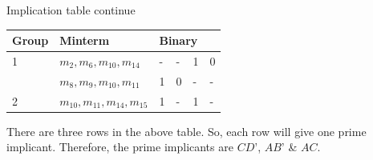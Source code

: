 \documentclass{beamer}
\newcommand{\mcl}[1]{\multicolumn{1}{l|}{#1}}
\begin{document}
\begin{frame}{Implication table continue}
    \begin{table}[]
        \begin{tabular}{l|l|llll}
            \hline
            \multicolumn{1}{|l|}{Group}         & Minterm        & \multicolumn{4}{l|}{Binary}     \\ \hline
            \rowcolor{row1} 1 \multirow{4}{*}{} & $m_2,m_6,m_{10},m_{14}$   & \mcl{-} & \mcl{-} & \mcl{1} & 0  \\ \cline{2-6}
            \rowcolor{row1}                     & $m_8,m_9,m_{10},m_{11}$ & \mcl{1} & \mcl{0} & \mcl{-} & - \\ \hline
            \rowcolor{row2} 2 \multirow{4}{*}{} & $m_{10},m_{11},m_{14},m_{15}$ & \mcl{1}  & \mcl{-}  & \mcl{1}  &  - \\ \hline
        \end{tabular}
    \end{table}
    There are three rows in the above table. So, each row will give one prime implicant. Therefore, the prime implicants are $CD’$, $AB’$ \& $AC$.
\end{frame}

\end{document}
